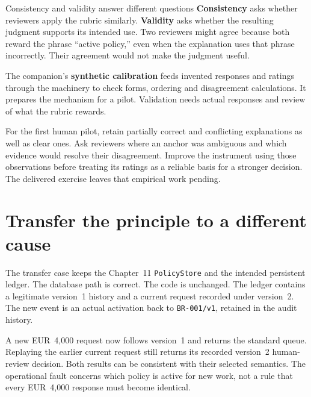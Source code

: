 \begin{conceptbox}{Consistency and validity answer different questions}
\textbf{Consistency} asks whether reviewers apply the rubric similarly. \textbf{Validity} asks whether the resulting judgment supports its intended use. Two reviewers might agree because both reward the phrase ``active policy,'' even when the explanation uses that phrase incorrectly. Their agreement would not make the judgment useful.

The companion's \textbf{synthetic calibration} feeds invented responses and ratings through the machinery to check forms, ordering and disagreement calculations. It prepares the mechanism for a pilot. Validation needs actual responses and review of what the rubric rewards.
\end{conceptbox}

For the first human pilot, retain partially correct and conflicting explanations as well as clear ones. Ask reviewers where an anchor was ambiguous and which evidence would resolve their disagreement. Improve the instrument using those observations before treating its ratings as a reliable basis for a stronger decision. The delivered exercise leaves that empirical work pending.

\section{Transfer the principle to a different cause}\label{sec:ch13-transfer}

The transfer case keeps the Chapter~11 \texttt{PolicyStore} and the intended persistent ledger. The database path is correct. The code is unchanged. The ledger contains a legitimate version~1 history and a current request recorded under version~2. The new event is an actual activation back to \texttt{BR-001/v1}, retained in the audit history.

A new EUR~4,000 request now follows version~1 and returns the standard queue. Replaying the earlier current request still returns its recorded version~2 human-review decision. Both results can be consistent with their selected semantics. The operational fault concerns which policy is active for new work, not a rule that every EUR~4,000 response must become identical.

